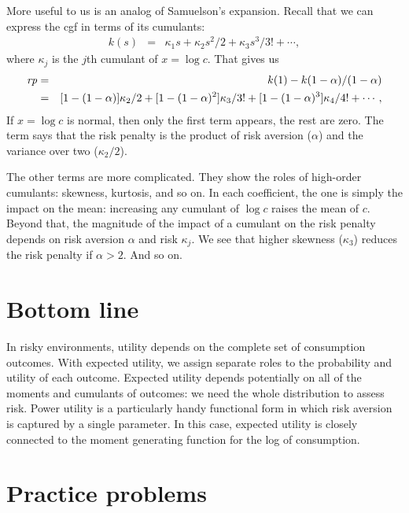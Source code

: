 \documentclass[11pt]{article}
\begin{document}
More useful to us is an analog of Samuelson's expansion.
Recall that we can express the cgf in terms of its cumulants:
\begin{eqnarray*}
    k(s) &=& \kappa_1 s + \kappa_2 s^2/2 + \kappa_3 s^3/3! + \cdots ,
\end{eqnarray*}
where $\kappa_j$ is the $j$th cumulant of $x = \log c$.
That gives us
\begin{eqnarray}
    \mbox{\em rp\/} &=& k(1) -  k(1-\alpha)/(1-\alpha) \nonumber \\
        &=& [1-(1-\alpha)] \kappa_2/2 + [1- (1-\alpha)^2] \kappa_3/3!
            + [1- (1-\alpha)^3] \kappa_4/4! + \cdots ,
        \label{eq:rp-cum-expansion}
\end{eqnarray}
If $x = \log c$ is normal, then only the first term appears,
the rest are zero.
The term says that the risk penalty is the product of risk aversion ($\alpha$)
and the variance over two ($\kappa_2/2$).

The other terms are more complicated.
They show the roles of high-order cumulants:  skewness, kurtosis, and so on.
In each coefficient, the one is simply the impact on the mean:
increasing any cumulant of $\log c$ raises the mean of $c$.
Beyond that, the magnitude of the impact of a cumulant
on the risk penalty depends on risk aversion $\alpha$ and risk $\kappa_j$.
We see that higher skewness ($\kappa_3$) reduces the risk penalty if $\alpha > 2$.
And so on.


\section*{Bottom line}

In risky environments, utility depends
on the complete set of consumption outcomes.
With expected utility, we assign separate roles to the probability
and utility of each outcome.
Expected utility depends potentially on all of the moments and cumulants
of outcomes:
we need the whole distribution to assess risk.
Power utility is a particularly handy functional form
in which risk aversion is captured by a single parameter.
In this case, expected utility is closely connected to the
moment generating function for the log of consumption.

\section*{Practice problems}
\end{document}
